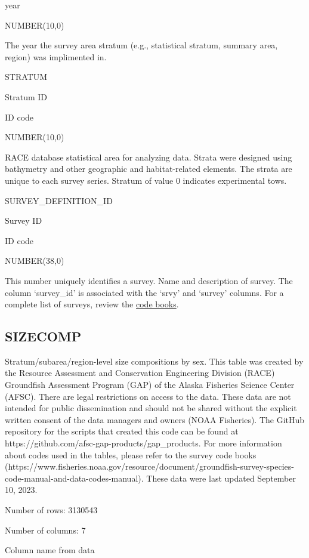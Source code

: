 \documentclass[
  letterpaper,
  oneside,
  open=any]{scrbook}
\begin{document}
year

NUMBER(10,0)

The year the survey area stratum (e.g., statistical stratum, summary
area, region) was implimented in.

STRATUM

Stratum ID

ID code

NUMBER(10,0)

RACE database statistical area for analyzing data. Strata were designed
using bathymetry and other geographic and habitat-related elements. The
strata are unique to each survey series. Stratum of value 0 indicates
experimental tows.

SURVEY\_DEFINITION\_ID

Survey ID

ID code

NUMBER(38,0)

This number uniquely identifies a survey. Name and description of
survey. The column `survey\_id' is associated with the `srvy' and
`survey' columns. For a complete list of surveys, review the
\href{https://www.fisheries.noaa.gov/resource/document/groundfish-survey-species-code-manual-and-data-codes-manual}{code
books}.

\hypertarget{sizecomp}{%
\subsection{SIZECOMP}\label{sizecomp}}

Stratum/subarea/region-level size compositions by sex. This table was
created by the Resource Assessment and Conservation Engineering Division
(RACE) Groundfish Assessment Program (GAP) of the Alaska Fisheries
Science Center (AFSC). There are legal restrictions on access to the
data. These data are not intended for public dissemination and should
not be shared without the explicit written consent of the data managers
and owners (NOAA Fisheries). The GitHub repository for the scripts that
created this code can be found at
https://github.com/afsc-gap-products/gap\_products. For more information
about codes used in the tables, please refer to the survey code books
(https://www.fisheries.noaa.gov/resource/document/groundfish-survey-species-code-manual-and-data-codes-manual).
These data were last updated September 10, 2023.

Number of rows: 3130543

Number of columns: 7

Column name from data
\end{document}
